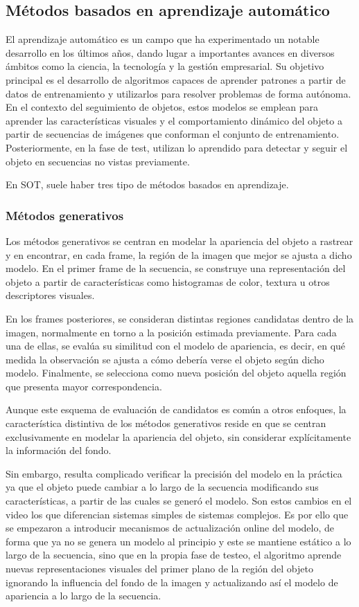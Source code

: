 \subsection{Métodos basados en aprendizaje automático}
El aprendizaje automático es un campo que ha experimentado un notable desarrollo en los últimos años, dando lugar a importantes avances en diversos ámbitos como la ciencia, la tecnología y la gestión empresarial. Su objetivo principal es el desarrollo de algoritmos capaces de aprender patrones a partir de datos de entrenamiento y utilizarlos para resolver problemas de forma autónoma. En el contexto del seguimiento de objetos, estos modelos se emplean para aprender las características visuales y el comportamiento dinámico del objeto a partir de secuencias de imágenes que conforman el conjunto de entrenamiento. Posteriormente, en la fase de test, utilizan lo aprendido para detectar y seguir el objeto en secuencias no vistas previamente. 

En SOT, suele haber tres tipo de métodos basados en aprendizaje.

\subsubsection{Métodos generativos}
Los métodos generativos se centran en modelar la apariencia del objeto a rastrear y en encontrar, en cada frame, la región de la imagen que mejor se ajusta a dicho modelo. En el primer frame de la secuencia, se construye una representación del objeto a partir de características como histogramas de color, textura u otros descriptores visuales.

En los frames posteriores, se consideran distintas regiones candidatas dentro de la imagen, normalmente en torno a la posición estimada previamente. Para cada una de ellas, se evalúa su similitud con el modelo de apariencia, es decir, en qué medida la observación se ajusta a cómo debería verse el objeto según dicho modelo. Finalmente, se selecciona como nueva posición del objeto aquella región que presenta mayor correspondencia.

Aunque este esquema de evaluación de candidatos es común a otros enfoques, la característica distintiva de los métodos generativos reside en que se centran exclusivamente en modelar la apariencia del objeto, sin considerar explícitamente la información del fondo. 

Sin embargo, resulta complicado verificar la precisión del modelo en la práctica ya que el objeto puede cambiar a lo largo de la secuencia modificando sus características, a partir de las cuales se generó el modelo. Son estos cambios en el video los que diferencian sistemas simples de sistemas complejos. Es por ello que se empezaron a introducir mecanismos de actualización online del modelo, de forma que ya no se genera un modelo al principio y este se mantiene estático a lo largo de la secuencia, sino que en la propia fase de testeo, el algoritmo aprende nuevas representaciones visuales del primer plano de la región del objeto ignorando la influencia del fondo de la imagen y actualizando así el modelo de apariencia a lo largo de la secuencia. 

